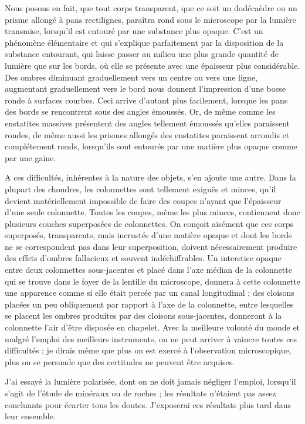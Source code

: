 \documentclass[a4paper, 12pt, oneside, french]{article}
\begin{document}
Nous posons en fait, que tout corps transparent, que ce soit un dodécaèdre ou un prisme allongé à pans rectilignes, paraîtra rond sous le microscope par la lumière transmise, lorsqu'il est entouré par une substance plus opaque. C'est un phénomène élémentaire et qui s'explique parfaitement par la disposition de la substance entourant, qui laisse passer au milieu une plus grande quantité de lumière que sur les bords, où elle se présente avec une épaisseur plus considérable. Des ombres diminuant graduellement vers un centre ou vers une ligne, augmentant graduellement vers le bord nous donnent l'impression d'une bosse ronde à surfaces courbes. Ceci arrive d'autant plus facilement, lorsque les pans des bords se rencontrent sous des angles émoussés. Or, de même comme les enstatites massives présentent des angles tellement émoussés qu'elles paraissent rondes, de même aussi les prismes allongés des enstatites paraissent arrondis et complétement ronds, lorsqu'ils sont entourés par une matière plus opaque comme par une gaine.

A ces difficultés, inhérentes à la nature des objets, s'en ajoute une autre. Dans la plupart des chondres, les colonnettes sont tellement exiguës et minces, qu'il devient matériellement impossible de faire des coupes n'ayant que l'épaisseur d'une seule colonnette. Toutes les coupes, même les plus minces, contiennent donc plusieurs couches superposées de colonnettes. On conçoit aisément que ces corps superposés, transparents, mais incrustés d'une matière opaque et dont les bords ne se correspondent pas dans leur superposition, doivent nécessairement produire des effets d'ombres fallacieux et souvent indéchiffrables. Un interstice opaque entre deux colonnettes sous-jacentes et placé dans l'axe médian de la colonnette qui se trouve dans le foyer de la lentille du microscope, donnera à cette colonnette une apparence comme si elle était percée par un canal longitudinal ; des cloisons placées un peu obliquement par rapport à l'axe de la colonnette, entre lesquelles se placent les ombres produites par des cloisons sous-jacentes, donneront à la colonnette l'air d'être disposée en chapelet. Avec la meilleure volonté du monde et malgré l'emploi des meilleurs instruments, on ne peut arriver à vaincre toutes ces difficultés ; je dirais même que plus on est exercé à l'observation microscopique, plus on se persuade que des certitudes ne peuvent être acquises.

J'ai essayé la lumière polarisée, dont on ne doit jamais négliger l'emploi, lorsqu'il s'agit de l'étude de minéraux ou de roches ; les résultats n'étaient pas assez concluants pour écarter tous les doutes. J'exposerai ces résultats plus tard dans leur ensemble.
\end{document}

